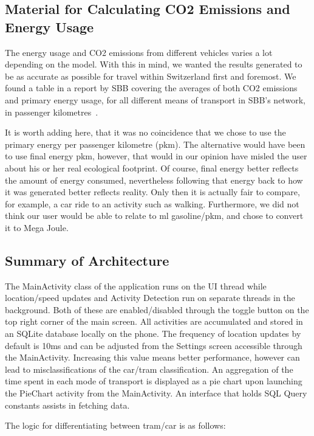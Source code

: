 \documentclass[10pt,conference,compsocconf]{IEEEtran}
\begin{document}
\subsection{Material for Calculating CO2 Emissions and Energy Usage}

The energy usage and CO2 emissions from different vehicles varies a lot depending on the model. With this in mind, we wanted the results generated to be as accurate as possible for travel within Switzerland first and foremost. We found a table in a report by SBB covering the averages of both CO2 emissions and primary energy usage, for all different means of transport in SBB’s network, in passenger kilometres~\cite{sbbcalculator2017}.

It is worth adding here, that it was no coincidence that we chose to use the primary energy per passenger kilometre (pkm). The alternative would have been to use final energy pkm, however, that would in our opinion have misled the user about his or her real ecological footprint. Of course, final energy better reflects the amount of energy consumed, nevertheless following that energy back to how it was generated better reflects reality. Only then it is actually fair to compare, for example, a car ride to an activity such as walking. 
Furthermore, we did not think our user would be able to relate to ml gasoline/pkm, and chose to convert it to Mega Joule. 


\subsection{Summary of Architecture}

The MainActivity class of the application runs on the UI thread while location/speed updates and Activity Detection run on separate threads in the background. Both of these are enabled/disabled through the toggle button on the top right corner of the main screen. All activities are accumulated and stored in an SQLite database locally on the phone. The frequency of location updates by default is 10ms and can be adjusted from the Settings screen accessible through the MainActivity. Increasing this value means better performance, however can lead to misclassifications of the car/tram classification. An aggregation of the time spent in each mode of transport is displayed as a pie chart upon launching the PieChart activity from the MainActivity. An interface that holds SQL Query constants assists in fetching data.

The logic for differentiating between tram/car is as follows:
\end{document}
